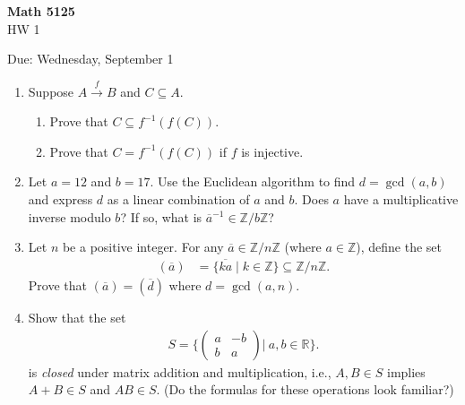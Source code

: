 \documentclass[12pt]{article}
\newcommand{\Z}{\mathbb{Z}}
\begin{document}
\begin{center}
{\bf Math 5125}\\
HW 1
\smallskip

Due: Wednesday, September 1
\end{center}


\begin{enumerate}

\item Suppose $A \overset{f}{\to} B$ and $C\subseteq A$. 
\begin{enumerate}
\item Prove that $C\subseteq f^{-1}(f(C))$.
\item Prove that $C=f^{-1}(f(C))$ if $f$ is injective.
\end{enumerate}

\item Let $a=12$ and $b=17$. Use the Euclidean algorithm to find $d=\gcd(a,b)$ and express $d$ as a linear combination of $a$ and $b$. Does $a$ have a multiplicative inverse modulo $b$? If so, what is $\overline{a}^{-1}\in\Z/b\Z$?

\item Let $n$ be a positive integer. For any $\overline{a}\in\Z/n\Z$ (where $a\in\Z$), define the set
\begin{align*}
( \overline{a} ) &= \{\overline{ka} \mid k \in \mathbb{Z}\} \subseteq \Z/n\Z.
\end{align*}
Prove that $( \overline{a} ) = ( \overline{d} )$ where $d=\gcd(a,n)$.

\item Show that the set 
\begin{align*}
S=\Big\{\begin{pmatrix}
a & -b \\ 
b & a
\end{pmatrix} {\Big|}\ a,b\in \mathbb{R}\Big\}.
\end{align*}
is {\em closed} under matrix addition and multiplication, i.e., $A,B\in S$ implies $A+B\in S$ and $AB\in S$. (Do the formulas for these operations look familiar?)


\end{enumerate}
\end{document}
